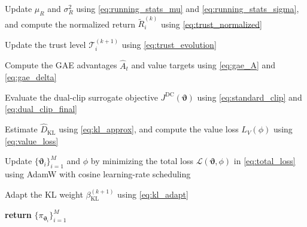 \documentclass[lettersize,journal]{IEEEtran}
\newcommand{\hladd}[1]{{\color{blue}#1}}
\begin{document}
\begin{algorithm}[!t]
\begin{algorithmic}[1]
    \ENDFOR


    \STATE Update $\mu_R$ and $\sigma_R^2$ using
    \eqref{eq:running_stats_mu} and
    \eqref{eq:running_stats_sigma}, and compute the normalized
    return $\widetilde{R}_i^{(k)}$ using
    \eqref{eq:trust_normalized}

    \STATE Update the trust level
    $\mathcal{T}_i^{(k+1)}$ using
    \eqref{eq:trust_evolution}


    \STATE Compute the GAE advantages $\hat{A}_t$ and value targets
    using \eqref{eq:gae_A} and \eqref{eq:gae_delta}


        \STATE Evaluate the dual-clip surrogate objective
        $J^{\mathrm{DC}}(\boldsymbol{\vartheta})$ using
        \eqref{eq:standard_clip} and
        \eqref{eq:dual_clip_final}

        \STATE Estimate $\widehat{D}_{\mathrm{KL}}$ using
        \eqref{eq:kl_approx}, and compute the value loss
        $L_V(\phi)$ using \eqref{eq:value_loss}

        \STATE Update $\{\boldsymbol{\vartheta}_i\}_{i=1}^{M}$
        and $\phi$ by minimizing the total loss
        $\mathcal{L}(\boldsymbol{\vartheta},\phi)$ in
        \eqref{eq:total_loss} using AdamW with cosine
        learning-rate scheduling

    \ENDFOR

    \STATE Adapt the KL weight
    $\beta_{\mathrm{KL}}^{(k+1)}$ using
    \eqref{eq:kl_adapt}

\ENDFOR

\STATE \textbf{return}
$\{\pi_{\boldsymbol{\vartheta}_i}\}_{i=1}^{M}$

\end{algorithmic}
\end{algorithm}




\end{document}
